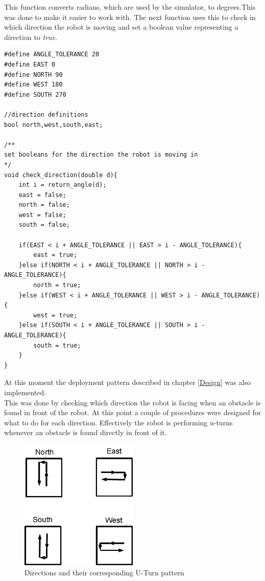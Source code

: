 This function converts radians, which are used by the simulator, to degrees.This was done to make it easier to work with.
The next function uses this to check in which direction the robot is moving and set a boolean value representing a direction to \textit{true}.

\begin{lstlisting}[caption={Early check of the movement direction}]
#define ANGLE_TOLERANCE 20
#define EAST 0
#define NORTH 90
#define WEST 180
#define SOUTH 270

//direction definitions
bool north,west,south,east;

/**
set booleans for the direction the robot is moving in
*/
void check_direction(double d){
    int i = return_angle(d);
    east = false;
    north = false;
    west = false;
    south = false;

    if(EAST < i + ANGLE_TOLERANCE || EAST > i - ANGLE_TOLERANCE){
        east = true;
    }else if(NORTH < i + ANGLE_TOLERANCE || NORTH > i - ANGLE_TOLERANCE){
        north = true;
    }else if(WEST < i + ANGLE_TOLERANCE || WEST > i - ANGLE_TOLERANCE){
        west = true;
    }else if(SOUTH < i + ANGLE_TOLERANCE || SOUTH > i - ANGLE_TOLERANCE){
        south = true;
    }
}
\end{lstlisting}

At this moment the deployment pattern described in chapter \ref{Design}  was also implemented. \\
This was done by checking which direction the robot is facing when an obstacle is found in front of the robot. At this point a couple of procedures were designed for what to do for each direction. Effectively the robot is performing u-turns whenever an obstacle is found directly in front of it.

\begin{figure}[h]
\centering
\includegraphics[width = 0.5\textwidth]{../../figures/direction_uturn_pattern}
\caption{Directions and their corresponding U-Turn pattern}
\label{directions_uturn_pattern}
\end{figure}

